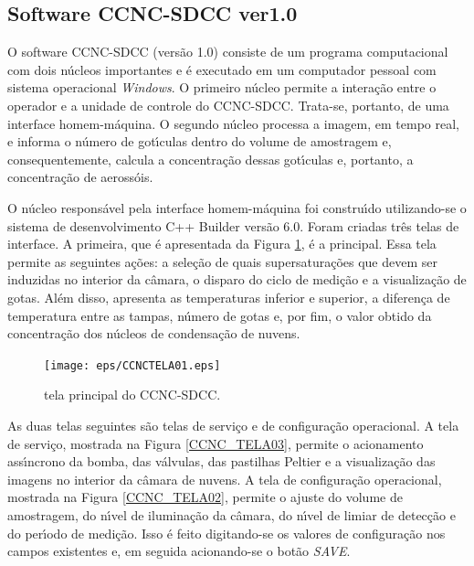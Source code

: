 \subsection{Software CCNC-SDCC ver1.0}

O software CCNC-SDCC (vers\~{a}o 1.0) consiste de um programa computacional com dois n\'{u}cleos importantes e \'{e} executado em um computador pessoal com sistema operacional \emph{Windows}. O primeiro n\'{u}cleo permite a intera\c{c}\~{a}o entre o operador e a unidade de controle do CCNC-SDCC. Trata-se, portanto, de uma interface homem-m\'{a}quina. O segundo n\'{u}cleo processa a imagem, em tempo real, e informa o n\'{u}mero de got\'{\i}culas dentro do volume de amostragem e, consequentemente, calcula a concentra\c{c}\~{a}o dessas got\'{\i}culas e, portanto, a concentra\c{c}\~{a}o de aeross\'{o}is.

O n\'{u}cleo respons\'{a}vel pela interface homem-m\'{a}quina foi constru\'{\i}do utilizando-se o sistema de desenvolvimento C++ Builder vers\~{a}o 6.0. Foram criadas tr\^{e}s telas de interface. A primeira, que \'{e} apresentada da Figura \ref{CCNCTELA01}, \'{e} a principal. Essa tela permite as seguintes a\c{c}\~{o}es: a sele\c{c}\~{a}o de quais supersatura\c{c}\~{o}es que devem ser induzidas no interior da c\^{a}mara, o disparo do ciclo de medi\c{c}\~{a}o e a visualiza\c{c}\~{a}o de gotas. Al\'{e}m disso, apresenta as temperaturas inferior e superior, a diferen\c{c}a de temperatura entre as tampas, n\'{u}mero de gotas e, por fim, o valor obtido da concentra\c{c}\~{a}o dos n\'{u}cleos de condensa\c{c}\~{a}o de nuvens.

\begin{figure}[!hbt]
\begin{center}
\texttt{[image: eps/CCNCTELA01.eps]}\\
\end{center}
\caption{\label{CCNCTELA01}\hspace{-0.1em} tela principal do CCNC-SDCC.}
\end{figure}

 As duas telas seguintes s\~{a}o telas de servi\c{c}o e de configura\c{c}\~{a}o operacional. A tela de servi\c{c}o, mostrada na Figura \ref{CCNC_TELA03}, permite o acionamento ass\'{\i}ncrono da bomba, das v\'{a}lvulas, das pastilhas Peltier e a visualiza\c{c}\~{a}o das imagens no interior da c\^{a}mara de nuvens. A tela de configura\c{c}\~{a}o operacional, mostrada na Figura \ref{CCNC_TELA02}, permite o ajuste do volume de amostragem, do n\'{\i}vel de ilumina\c{c}\~{a}o da c\^{a}mara, do n\'{\i}vel de limiar de detec\c{c}\~{a}o e do per\'{\i}odo de medi\c{c}\~{a}o. Isso \'{e} feito digitando-se os valores de configura\c{c}\~{a}o nos campos existentes e, em seguida acionando-se o bot\~{a}o \emph{SAVE}.


